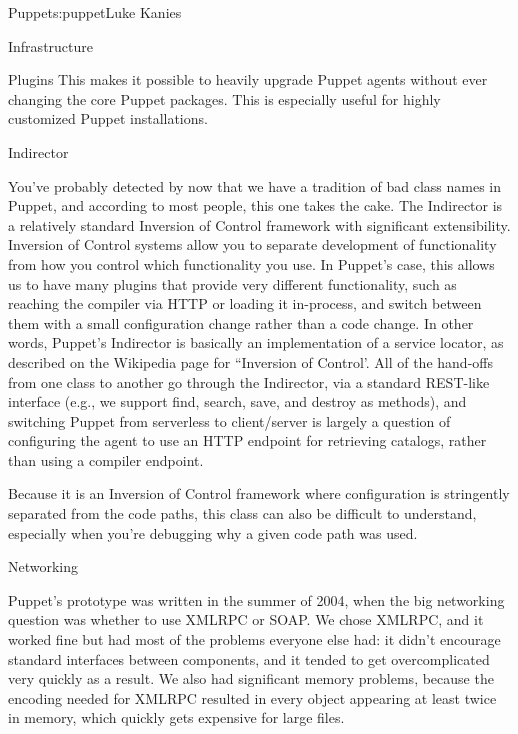 \begin{aosachapter}{Puppet}{s:puppet}{Luke Kanies}
\begin{aosasect1}{Infrastructure}
\begin{aosasect2}{Plugins}
This makes it possible to heavily upgrade Puppet agents without ever
changing the core Puppet packages. This is especially useful for
highly customized Puppet installations.

\end{aosasect2}

\begin{aosasect2}{Indirector}

You've probably detected by now that we have a tradition of bad class
names in Puppet, and according to most people, this one takes the
cake.  The Indirector is a relatively standard Inversion of Control
framework with significant extensibility.  Inversion of Control
systems allow you to separate development of functionality from how
you control which functionality you use.  In Puppet's case, this
allows us to have many plugins that provide very different
functionality, such as reaching the compiler via HTTP or loading it
in-process, and switch between them with a small configuration change
rather than a code change.  In other words, Puppet's Indirector is
basically an implementation of a service locator, as described on the
Wikipedia page for ``Inversion of Control'.  All of the hand-offs from
one class to another go through the Indirector, via a standard
REST-like interface (e.g., we support find, search, save, and destroy
as methods), and switching Puppet from serverless to client/server is
largely a question of configuring the agent to use an HTTP endpoint
for retrieving catalogs, rather than using a compiler endpoint.

Because it is an Inversion of Control framework where configuration
is stringently separated from the code paths, this class can also be
difficult to understand, especially when you're debugging why a given
code path was used.

\end{aosasect2}

\begin{aosasect2}{Networking}

Puppet's prototype was written in the summer of 2004, when the big
networking question was whether to use XMLRPC or SOAP.  We chose
XMLRPC, and it worked fine but had most of the problems everyone else
had: it didn't encourage standard interfaces between components, and
it tended to get overcomplicated very quickly as a result.  We also
had significant memory problems, because the encoding needed for
XMLRPC resulted in every object appearing at least twice in memory,
which quickly gets expensive for large files.


\end{aosasect2}
\end{aosasect1}
\end{aosachapter}

